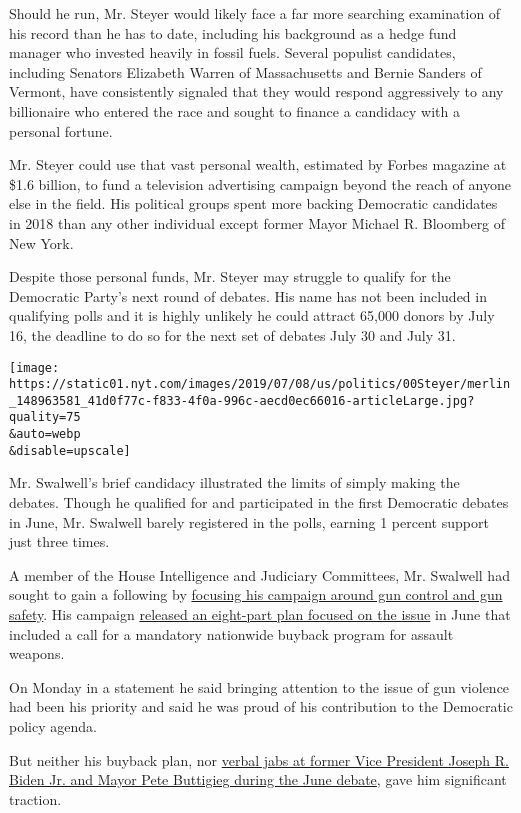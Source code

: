 Should he run, Mr. Steyer would likely face a far more searching
examination of his record than he has to date, including his background
as a hedge fund manager who invested heavily in fossil fuels. Several
populist candidates, including Senators Elizabeth Warren of
Massachusetts and Bernie Sanders of Vermont, have consistently signaled
that they would respond aggressively to any billionaire who entered the
race and sought to finance a candidacy with a personal fortune.

Mr. Steyer could use that vast personal wealth, estimated by Forbes
magazine at \$1.6 billion, to fund a television advertising campaign
beyond the reach of anyone else in the field. His political groups spent
more backing Democratic candidates in 2018 than any other individual
except former Mayor Michael R. Bloomberg of New York.

Despite those personal funds, Mr. Steyer may struggle to qualify for the
Democratic Party's next round of debates. His name has not been included
in qualifying polls and it is highly unlikely he could attract 65,000
donors by July 16, the deadline to do so for the next set of debates
July 30 and July 31.

\texttt{[image: https://static01.nyt.com/images/2019/07/08/us/politics/00Steyer/merlin\_148963581\_41d0f77c-f833-4f0a-996c-aecd0ec66016-articleLarge.jpg?quality=75\\\&auto=webp\\\&disable=upscale]}

Mr. Swalwell's brief candidacy illustrated the limits of simply making
the debates. Though he qualified for and participated in the first
Democratic debates in June, Mr. Swalwell barely registered in the polls,
earning 1 percent support just three times.

A member of the House Intelligence and Judiciary Committees, Mr.
Swalwell had sought to gain a following by
\href{https://www.nytimes.com/2019/06/27/us/politics/eric-swalwell-gun-control.html}{focusing
his campaign around gun control and gun safety}. His campaign
\href{https://ericswalwell.com/endgunviolence/}{released an eight-part
plan focused on the issue} in June that included a call for a mandatory
nationwide buyback program for assault weapons.

On Monday in a statement he said bringing attention to the issue of gun
violence had been his priority and said he was proud of his contribution
to the Democratic policy agenda.

But neither his buyback plan, nor
\href{https://www.nytimes.com/2019/06/27/us/politics/democratic-debate-live.html}{verbal
jabs at former Vice President Joseph R. Biden Jr. and Mayor Pete
Buttigieg during the June debate}, gave him significant traction.

